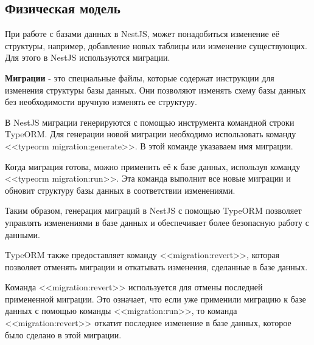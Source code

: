 \subsection*{Физическая модель}

При работе с базами данных в NestJS, может понадобиться изменение её структуры, например, добавление новых таблицы или изменение существующих.
Для этого в NestJS используются миграции.

\textbf{Миграции} - это специальные файлы, которые содержат инструкции для изменения структуры базы данных.
Они позволяют изменять схему базы данных без необходимости вручную изменять ее структуру.

В NestJS миграции генерируются с помощью инструмента командной строки TypeORM.
Для генерации новой миграции необходимо использовать команду <<typeorm migration:generate>>.
В этой команде указаваем имя миграции.

Когда миграция готова, можно применить её к базе данных, используя команду <<typeorm migration:run>>.
Эта команда выполнит все новые миграции и обновит структуру базы данных в соответствии изменениями.

Таким образом, генерация миграций в NestJS с помощью TypeORM позволяет управлять изменениями в базе данных и обеспечивает более безопасную работу с данными.

TypeORM также предоставляет команду <<migration:revert>>, которая позволяет отменять миграции и откатывать изменения, сделанные в базе данных.

Команда <<migration:revert>> используется для отмены последней примененной миграции.
Это означает, что если уже применили миграцию к базе данных с помощью команды <<migration:run>>,
то команда <<migration:revert>> откатит последнее изменение в базе данных, которое было сделано в этой миграции.
